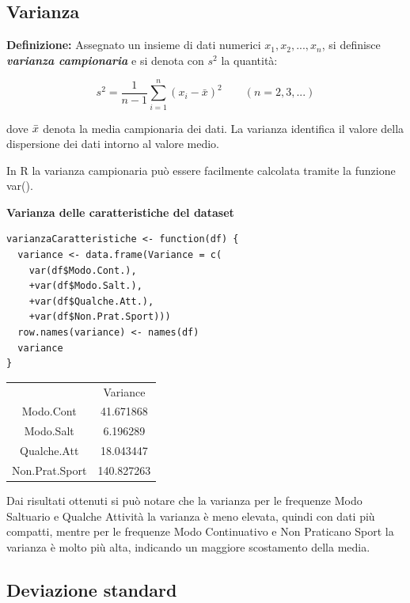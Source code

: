 \subsection{Varianza}\label{cap3.2.1}

\noindent \textbf{Definizione:} Assegnato un insieme di dati numerici $x_1, x_2, ..., x_n$, si definisce \textbf{\textit{varianza campionaria}} e si denota con $s^2$ la quantità:

\[s^2 = \frac{1}{n-1} \sum_{i=1}^n (x_i - \bar x)^2 \quad \quad (n = 2, 3, ...) \]

dove $\Bar{x}$ denota la media campionaria dei dati. La varianza identifica il valore della dispersione dei dati intorno al valore medio.

In R la varianza campionaria può essere facilmente calcolata tramite la funzione var().

\vspace{5mm}
\noindent \textbf{Varianza delle caratteristiche del dataset}


\begin{lstlisting}
varianzaCaratteristiche <- function(df) {
  variance <- data.frame(Variance = c(
    var(df$Modo.Cont.),
    +var(df$Modo.Salt.),
    +var(df$Qualche.Att.),
    +var(df$Non.Prat.Sport)))
  row.names(variance) <- names(df)
  variance
}
\end{lstlisting}
\vspace{5mm}

\vspace{5mm}
\begin{tabular}{ c c}
  & Variance\\
 Modo.Cont & 41.671868\\ 
 Modo.Salt & 6.196289\\
 Qualche.Att & 18.043447\\ 
 Non.Prat.Sport & 140.827263\\ 
\end{tabular}
\vspace{5mm}

Dai risultati ottenuti si può notare che la varianza per le frequenze Modo Saltuario e Qualche Attività la varianza è meno elevata, quindi con dati più compatti, mentre per le frequenze Modo Continuativo e Non Praticano Sport la varianza è molto più alta, indicando un maggiore scostamento della media.

\subsection{Deviazione standard}\label{cap3.2.2}

